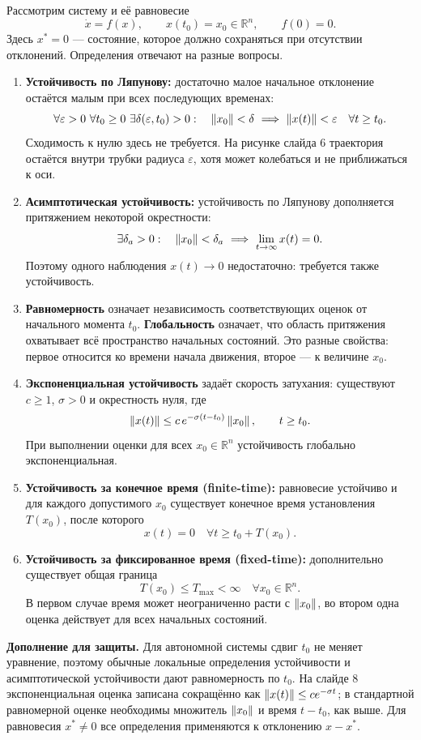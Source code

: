 Рассмотрим систему и её равновесие
\[
 \dot x=f(x),\qquad x(t_0)=x_0\in\mathbb R^n,\qquad f(0)=0.
\]
Здесь $x^*=0$ --- состояние, которое должно сохраняться при
отсутствии отклонений. Определения отвечают на разные вопросы.
\begin{enumerate}[leftmargin=*,itemsep=3pt]
 \item \textbf{Устойчивость по Ляпунову:} достаточно малое начальное
 отклонение остаётся малым при всех последующих временах:
 \[
  \forall\varepsilon>0\ \forall t_0\ge0\ \exists\delta(\varepsilon,t_0)>0:
  \quad \norm{x_0}<\delta\ \Longrightarrow\
  \norm{x(t)}<\varepsilon\quad\forall t\ge t_0.
 \]
 Сходимость к нулю здесь не требуется. На рисунке слайда 6
 траектория остаётся внутри трубки радиуса $\varepsilon$, хотя
 может колебаться и не приближаться к оси.
 \item \textbf{Асимптотическая устойчивость:} устойчивость по Ляпунову
 дополняется притяжением некоторой окрестности:
 \[
  \exists\delta_a>0:\quad \left\lVert x_0\right\rVert<\delta_a
  \ \Longrightarrow\ \lim_{t\to\infty}x(t)=0.
 \]
 Поэтому одного наблюдения $x(t)\to0$ недостаточно: требуется
 также устойчивость.
 \item \textbf{Равномерность} означает независимость соответствующих
 оценок от начального момента $t_0$. \textbf{Глобальность}
 означает, что область притяжения охватывает всё пространство
 начальных состояний. Это разные свойства: первое относится
 ко времени начала движения, второе --- к величине $x_0$.
 \item \textbf{Экспоненциальная устойчивость} задаёт скорость
 затухания: существуют $c\ge1$, $\sigma>0$ и окрестность нуля, где
 \[
  \left\lVert x(t)\right\rVert\le c\,e^{-\sigma(t-t_0)}\left\lVert x_0\right\rVert,\qquad t\ge t_0.
 \]
 При выполнении оценки для всех $x_0\in\mathbb R^n$ устойчивость
 глобально экспоненциальная.
 \item \textbf{Устойчивость за конечное время (finite-time):}
 равновесие устойчиво и для каждого допустимого $x_0$ существует
 конечное время установления $T(x_0)$, после которого
 \[
  x(t)=0\quad\forall t\ge t_0+T(x_0).
 \]
 \item \textbf{Устойчивость за фиксированное время (fixed-time):}
 дополнительно существует общая граница
 \[
  T(x_0)\le T_{\max}<\infty\quad\forall x_0\in\mathbb R^n.
 \]
 В первом случае время может неограниченно расти с $\left\lVert x_0\right\rVert$,
 во втором одна оценка действует для всех начальных состояний.
\end{enumerate}

\textbf{Дополнение для защиты.}
Для автономной системы сдвиг $t_0$ не меняет уравнение, поэтому
обычные локальные определения устойчивости и асимптотической
устойчивости дают равномерность по $t_0$.
На слайде 8 экспоненциальная оценка записана сокращённо как
$\left\lVert x(t)\right\rVert\le ce^{-\sigma t}$; в стандартной равномерной оценке
необходимы множитель $\left\lVert x_0\right\rVert$ и время $t-t_0$, как выше.
Для равновесия $x^*\ne0$ все определения применяются к
отклонению $x-x^*$.

